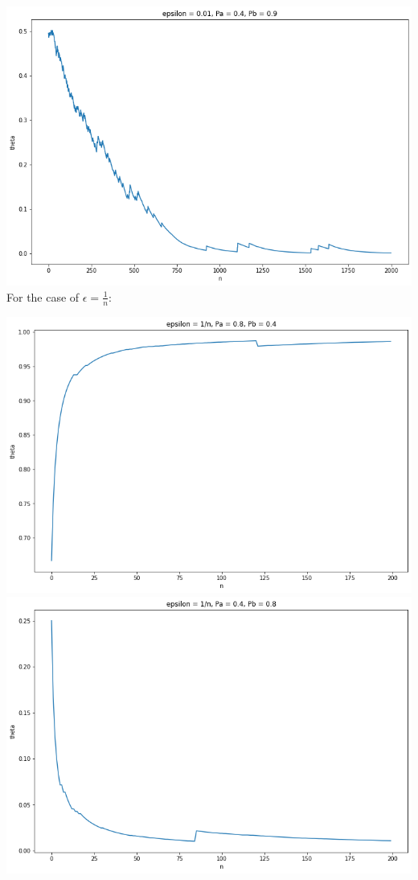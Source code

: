 \documentclass{article}
\begin{document}
\includegraphics[width=0.9\linewidth]{const_b.png}\\

For the case of $\epsilon=\frac{1}{n}$:

\includegraphics[width=0.9\linewidth]{repr_a.png}\\
\includegraphics[width=0.9\linewidth]{repr_b.png}\\
\end{document}
